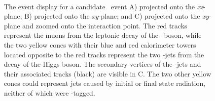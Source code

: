 \begin{figure}[htbp]
  \centering
  \mbox{
  }
  \mbox{
  }
  \caption[Event Display for \ZmmHbb\ Candidate]{The event display for a candidate \ZmmHbb\ event A) projected onto the \textit{xz}-plane; B) projected onto the \textit{xy}-plane; and C) projected onto the \textit{xy}-plane and zoomed onto the interaction point. The red tracks represent the muons from the leptonic decay of the \bosZ\ boson, while the two yellow cones with their blue and red calorimeter towers located opposite to the red tracks represent the two \qrkb-jets from the decay of the Higgs boson. The secondary vertices of the \qrkb-jets and their associated tracks (black) are visible in C. The two other yellow cones could represent jets caused by initial or final state radiation, neither of which were \qrkb-tagged.}
  \label{fig:evt_disp_Zmm}
\end{figure}

